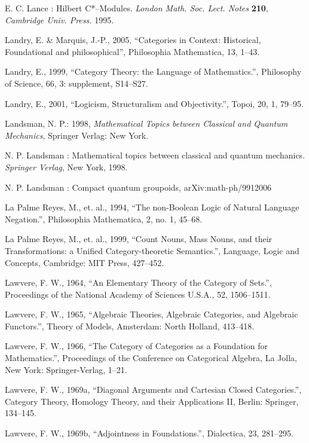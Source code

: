 \documentclass[12pt]{article}
\begin{document}
\begin{thebibliography}{399}
E. C. Lance :  Hilbert C*--Modules. \emph{London Math. Soc. Lect.
Notes} \textbf{210}, \emph{Cambridge Univ. Press.} 1995.

Landry, E. \& Marquis, J.-P., 2005, ``Categories in Context: Historical, Foundational and philosophical'', Philosophia Mathematica, 13, 1--43.  

Landry, E., 1999, ``Category Theory: the Language of Mathematics.'', Philosophy of Science, 66, 3: supplement, S14--S27. 

Landry, E., 2001, ``Logicism, Structuralism and Objectivity.'', Topoi, 20, 1, 79--95. 

Landsman, N. P.: 1998, \emph{Mathematical Topics between Classical and Quantum Mechanics}, Springer Verlag: New York.

N. P. Landsman :  Mathematical topics between classical and
quantum mechanics. \emph{Springer Verlag}, New York, 1998.

N. P. Landsman : Compact quantum groupoids, arXiv:math-ph/9912006

La Palme Reyes, M., et. al., 1994, ``The non-Boolean Logic of Natural Language Negation.'', Philosophia Mathematica, 2, no. 1, 45--68.

La Palme Reyes, M., et. al., 1999, ``Count Nouns, Mass Nouns, and their Transformations: a Unified Category-theoretic Semantics.'', Language, Logic and Concepts, Cambridge: MIT Press, 427--452.  
 

Lawvere, F. W., 1964, ``An Elementary Theory of the Category of Sets.'', Proceedings of the National Academy of Sciences U.S.A., 52, 1506--1511. 

Lawvere, F. W., 1965, ``Algebraic Theories, Algebraic Categories, and Algebraic Functors.'', Theory of Models, Amsterdam: North Holland, 413--418.  

Lawvere, F. W., 1966, ``The Category of Categories as a Foundation for Mathematics.'', Proceedings of the Conference on Categorical Algebra, La Jolla, New York: Springer-Verlag, 1--21. 

Lawvere, F. W., 1969a, ``Diagonal Arguments and Cartesian Closed Categories.'', Category Theory, Homology Theory, and their Applications II, Berlin: Springer, 134--145.  

Lawvere, F. W., 1969b, ``Adjointness in Foundations.'', Dialectica, 23, 281--295.  


\end{thebibliography}
\end{document}
